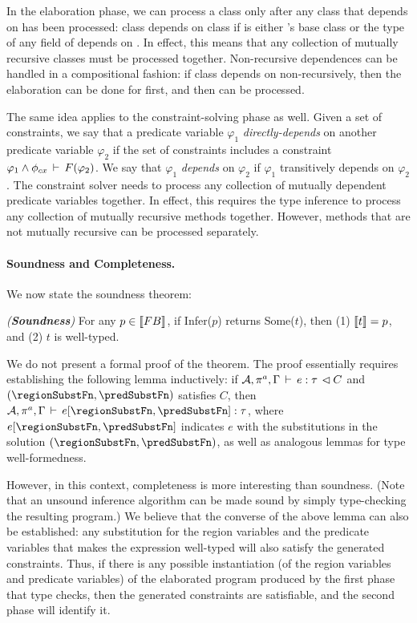 In the elaboration phase, we can process a class  only after any class
 that  depends on has been processed: class  depends on
class  if  is either 's base class or the type of any field
of  depends on . In effect, this means that any collection of
mutually recursive classes must be processed together. Non-recursive
dependences can be handled in a compositional fashion: if class 
depends on  non-recursively, then the elaboration can be done for
 first, and then  can be processed.

The same idea applies to the constraint-solving phase as well.
Given a set of constraints, we say that a predicate variable $\varphi_1$
\emph{directly-depends} on another predicate variable $\varphi_2$ if the set of
constraints includes a constraint $\varphi_1 \wedge \phi_{cx}\,\vdash\,F(\varphi_2)$.
We say that $\varphi_1$ \emph{depends} on $\varphi_2$ if $\varphi_1$ transitively
depends on $\varphi_2$.
The constraint solver needs to process any collection of mutually dependent
predicate variables together.
In effect, this requires the type inference to process any collection of
mutually recursive methods together.
However, methods that are not mutually recursive can be processed separately.

\paragraph{Soundness and Completeness.}

We now state the soundness theorem:

\begin{theorem}
\emph{(\textbf{Soundness})}
For any $p \in \llbracket {\sc FB} \rrbracket$, if Infer($p$) returns Some($t$), then
(1) $\llbracket t \rrbracket = p$, and
(2) $t$ is well-typed.
\end{theorem}

We do not present a formal proof of the theorem. The proof essentially requires
establishing the following lemma inductively: if
$
 {{\mathcal{A}},\pi^a,\Gamma} \, \vdash \, {e} : {\tau} \, \lhd {C}
$
and $(\regionSubstFn,\predSubstFn)$ satisfies $C$, then
$
 \hastyp {\exptycx{\ralloc}{\env}}{e[\regionSubstFn,\predSubstFn]}{\tau}
$,
where $e[\regionSubstFn,\predSubstFn]$ indicates $e$ with the substitutions
in the solution $(\regionSubstFn,\predSubstFn)$,
as well as analogous lemmas for type well-formedness.

However, in this context, completeness is more interesting than soundness.
(Note that an unsound inference algorithm can be made sound by simply type-checking
the resulting program.)
We believe that the converse of the above lemma can also be established:
any substitution for the region variables and the predicate variables that makes the
expression well-typed will also satisfy the generated constraints.
Thus, if there is any possible instantiation (of the region variables and predicate variables) of
the elaborated program produced by the first phase that type checks, then the generated
constraints are satisfiable, and the second phase will identify it.

